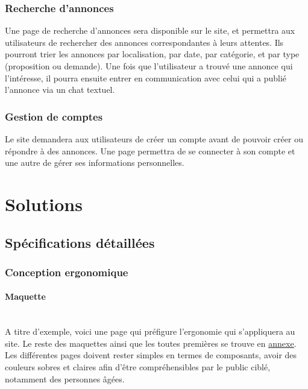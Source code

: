 \documentclass[a4paper,11pt]{article}
\begin{document}
\subsubsection{Recherche d’annonces}

Une page de recherche d’annonces sera disponible sur le site, et permettra aux utilisateurs de
rechercher des annonces correspondantes à leurs attentes. Ils pourront trier les annonces par
localisation, par date, par catégorie, et par type (proposition ou demande). Une fois que l’utilisateur
a trouvé une annonce qui l'intéresse, il pourra ensuite entrer en communication avec celui qui a
publié l’annonce via un chat textuel.\\

\subsubsection{Gestion de comptes}

Le site demandera aux utilisateurs de créer un compte avant de pouvoir créer ou répondre à des
annonces. Une page permettra de se connecter à son compte et une autre de gérer ses informations
personnelles.\\

\newpage


\section{Solutions}

\subsection{Spécifications détaillées}

\subsubsection{Conception ergonomique}
\paragraph{Maquette}\mbox{} \\

A titre d’exemple, voici une page qui préfigure l’ergonomie qui s’appliquera au site. Le reste des maquettes ainsi que les toutes premières se trouve en \underline{\hyperref[sec:maquettes-annexe]{annexe}}. Les différentes pages doivent rester
simples en termes de composants, avoir des couleurs sobres et claires afin d’être compréhensibles
par le public ciblé, notamment des personnes âgées.\\
\end{document}
